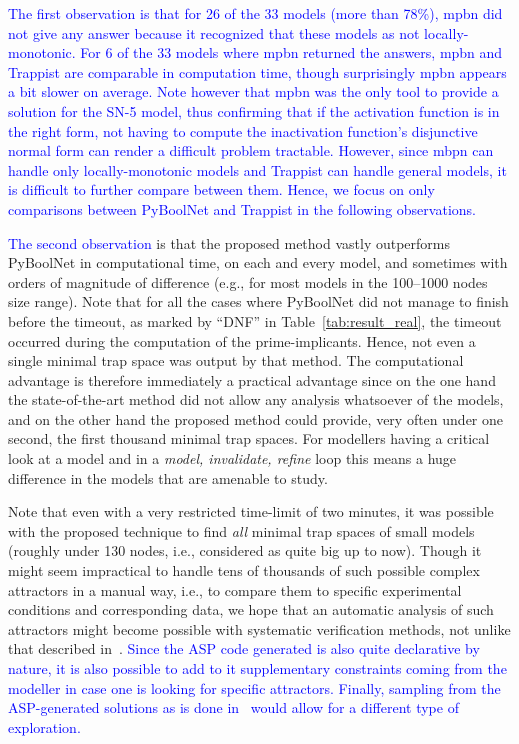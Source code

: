 \documentclass[runningheads]{llncs}
\newcommand{\revise}[1]{\textcolor{blue}{#1}}
\begin{document}

\revise{The first observation is that for 26 of the 33 models (more than 78\%), mpbn did not give any answer because it recognized that these models as not locally-monotonic.
For 6 of the 33 models where mpbn returned the answers, mpbn and Trappist are comparable in computation time, though surprisingly mpbn appears a bit slower on average.
Note however that mpbn was the only tool to provide a solution for the SN-5 model, thus confirming that if the activation function is in the right form, not having to compute the inactivation function's disjunctive normal form can render a difficult problem tractable.
However, since mbpn can handle only locally-monotonic models and Trappist can handle general models, it is difficult to further compare between them.
Hence, we focus on only comparisons between PyBoolNet and Trappist in the following observations.}

\revise{The second observation} is that the proposed method vastly outperforms PyBoolNet in computational time, on each and every model, and sometimes with orders of magnitude of difference (e.g., for most models in the 100--1000 nodes size range).
Note that for all the cases where PyBoolNet did not manage to finish before the timeout, as marked by ``DNF'' in Table~\ref{tab:result_real}, the timeout occurred during the computation of the prime-implicants.
Hence, not even a single minimal trap space was output by that method.
The computational advantage is therefore immediately a practical advantage since on the one hand the state-of-the-art method did not allow any analysis whatsoever of the models, and on the other hand the proposed method could provide, very often under one second, the first thousand minimal trap spaces.
For modellers having a critical look at a model and in a \emph{model, invalidate, refine} loop this means a huge difference in the models that are amenable to study.

Note that even with a very restricted time-limit of two minutes, it was possible with the proposed technique to find \emph{all} minimal trap spaces of small models (roughly under 130 nodes, i.e., considered as quite big up to now).
Though it might seem impractical to handle tens of thousands of such possible complex attractors in a manual way, i.e., to compare them to specific experimental conditions and corresponding data, we hope that an automatic analysis of such attractors might become possible with systematic verification methods, not unlike that described in~\cite{hernandez2020computational}.
\revise{Since the ASP code generated is also quite declarative by nature, it is also possible to add to it supplementary constraints coming from the modeller in case one is looking for specific attractors.
Finally, sampling from the ASP-generated solutions as is done in~\cite{chevalier2020synthesis} would allow for a different type of exploration.}
\end{document}
